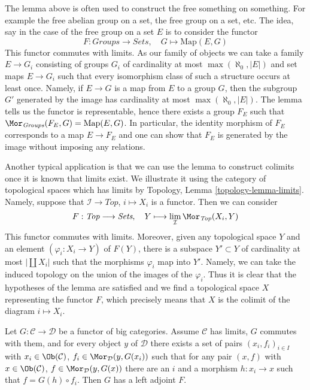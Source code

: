 \begin{remark}
\label{remark-how-to-use-it}
The lemma above is often used to construct the free something on something.
For example the free abelian group on a set, the free group on a set, etc.
The idea, say in the case of the free group on a set $E$ is to
consider the functor
$$
F : \textit{Groups} \to \textit{Sets},\quad
G \longmapsto \text{Map}(E, G)
$$
This functor commutes with limits. As our family of objects
we can take a family $E \to G_i$ consisting of groups $G_i$
of cardinality at most $\max(\aleph_0, |E|)$ and set maps
$E \to G_i$ such that every isomorphism class of such a structure
occurs at least once. Namely, if $E \to G$ is a map from $E$ to
a group $G$, then the subgroup $G'$ generated by the image has
cardinality at most $\max(\aleph_0, |E|)$. The lemma tells us
the functor is representable, hence there exists a group
$F_E$ such that $\Mor_{\textit{Groups}}(F_E, G) = \text{Map}(E, G)$.
In particular, the identity morphism of $F_E$ corresponds to
a map $E \to F_E$ and one can show that $F_E$ is generated by
the image without imposing any relations.

\medskip\noindent
Another typical application is that we can use the lemma to construct
colimits once it is known that limits exist. We illustrate it using
the category of topological spaces which has limits by
Topology, Lemma \ref{topology-lemma-limits}. Namely, suppose
that $\mathcal{I} \to \textit{Top}$, $i \mapsto X_i$ is a functor.
Then we can consider
$$
F : \textit{Top} \longrightarrow \textit{Sets},\quad
Y \longmapsto \lim_\mathcal{I} \Mor_{\textit{Top}}(X_i, Y)
$$
This functor commutes with limits. Moreover, given any topological space
$Y$ and an element $(\varphi_i : X_i \to Y)$ of $F(Y)$, there is
a subspace $Y' \subset Y$ of cardinality at most $|\coprod X_i|$
such that the morphisms $\varphi_i$ map into $Y'$. Namely, we can
take the induced topology on the union of the images of the $\varphi_i$.
Thus it is clear that the hypotheses of the lemma are satisfied and we find a
topological space $X$
representing the functor $F$, which precisely means that $X$ is
the colimit of the diagram $i \mapsto X_i$.
\end{remark}

\begin{theorem}
\label{theorem-adjoint-functor}
Let $G : \mathcal{C} \to \mathcal{D}$ be a functor of big categories.
Assume $\mathcal{C}$ has limits, $G$ commutes with them, and for
every object $y$ of $\mathcal{D}$ there exists a set of pairs
$(x_i, f_i)_{i \in I}$ with $x_i \in \Ob(\mathcal{C})$,
$f_i \in \Mor_\mathcal{D}(y, G(x_i))$ such that for any
pair $(x, f)$ with $x \in \Ob(\mathcal{C})$,
$f \in \Mor_\mathcal{D}(y, G(x))$ there are an $i$ and a morphism
$h : x_i \to x$ such that $f = G(h) \circ f_i$.
Then $G$ has a left adjoint $F$.
\end{theorem}

